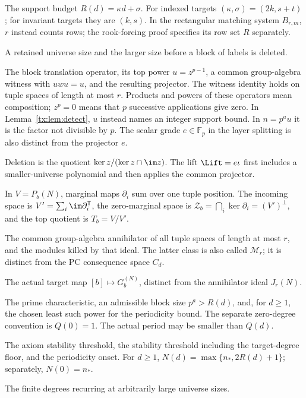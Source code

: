 \begin{description}[style=nextline,leftmargin=1em,labelindent=0pt,labelwidth=0pt]
\item[$r=R(d),\kappa,\sigma$] The support budget $R(d)=\kappa d+\sigma$.
For indexed targets $(\kappa,\sigma)=(2k,s+t)$; for invariant targets
they are $(k,s)$.
In the rectangular matching system $B_{r,m}$, $r$ instead counts
rows; the rook-forcing proof specifies its row set $R$ separately.
\item[$n,N=n+q$] A retained universe size and the larger size before
a block of labels is deleted.
\item[$z,u,w,e$] The block translation operator, its top power
$u=z^{p-1}$, a common group-algebra witness with $uwu=u$, and the
resulting projector. The witness identity holds on tuple spaces of
length at most $r$. Products and powers of these operators mean
composition; $z^p=0$ means that $p$ successive applications give zero.
In Lemma~\ref{tx:lem:detect}, $u$ instead names an integer support
bound. In $n=p^au$ it is the factor not divisible by $p$.
The scalar grade $e\in\mathbb F_p$ in the layer splitting is also
distinct from the projector $e$.
\item[$\Del,\Lift$] Deletion is the quotient
$\ker z/(\ker z\cap\im z)$. The lift $\Lift=e\iota$ first includes
a smaller-universe polynomial and then applies the common projector.
\item[$V',\mathcal Z_b,T_b$] In $V=P_b(N)$, marginal maps $\partial_i$
sum over one tuple position. The incoming space is
$V'=\sum_i\im\partial_i^{\mathsf T}$, the zero-marginal space is
$\mathcal Z_b=\bigcap_i\ker\partial_i=(V')^\perp$, and the top quotient
is $T_b=V/V'$.
\item[$J_r(N),\mathcal C_r(N)$] The common group-algebra annihilator of
all tuple spaces of length at most $r$, and the modules killed by that
ideal. The latter class is also called $\mathcal M_r$; it is distinct
from the PC consequence space $C_d$.
\item[$J_N$] The actual target map $[b]\mapsto G_b^{(N)}$, distinct from
the annihilator ideal $J_r(N)$.
\item[$p,q,Q(d)$] The prime characteristic, an admissible block size
$p^a>R(d)$, and, for $d\ge1$, the chosen least such power for the
periodicity bound. The separate zero-degree convention is $Q(0)=1$.
The actual period may be smaller than $Q(d)$.
\item[$n_0,n_*,N(d)$] The axiom stability threshold, the stability threshold
including the target-degree floor, and the periodicity onset.
For $d\ge1$, $N(d)=\max\{n_*,2R(d)+1\}$; separately, $N(0)=n_*$.
\item[$E(h)$] The finite degrees recurring at arbitrarily large universe sizes.

\end{description}
